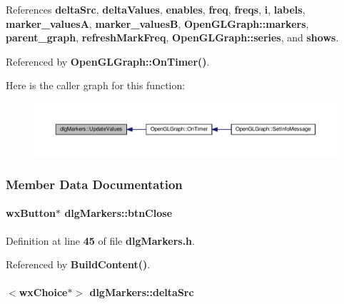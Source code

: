 References {\bf delta\+Src}, {\bf delta\+Values}, {\bf enables}, {\bf freq}, {\bf freqs}, {\bf i}, {\bf labels}, {\bf marker\+\_\+valuesA}, {\bf marker\+\_\+valuesB}, {\bf Open\+G\+L\+Graph\+::markers}, {\bf parent\+\_\+graph}, {\bf refresh\+Mark\+Freq}, {\bf Open\+G\+L\+Graph\+::series}, and {\bf shows}.



Referenced by {\bf Open\+G\+L\+Graph\+::\+On\+Timer()}.



Here is the caller graph for this function\+:
\nopagebreak
\begin{figure}[H]
\begin{center}
\leavevmode
\includegraphics[width=350pt]{d4/d19/classdlgMarkers_afc43669850e6de9b1ed16d6b42d7790f_icgraph}
\end{center}
\end{figure}




\subsubsection{Member Data Documentation}
\paragraph[{btn\+Close}]{\setlength{\rightskip}{0pt plus 5cm}wx\+Button$\ast$ dlg\+Markers\+::btn\+Close}\label{classdlgMarkers_ac05e6df50f2173f9367eec0f8483a9df}


Definition at line {\bf 45} of file {\bf dlg\+Markers.\+h}.



Referenced by {\bf Build\+Content()}.

\paragraph[{delta\+Src}]{$<$wx\+Choice$\ast$$>$ dlg\+Markers\+::delta\+Src}\label{classdlgMarkers_adfe73b769b50240e3d5f0881b213f389}


